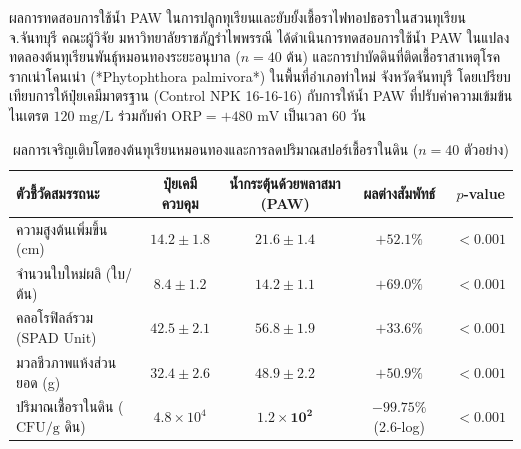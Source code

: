 \begin{agribox}{ผลการทดสอบการใช้น้ำ PAW ในการปลูกทุเรียนและยับยั้งเชื้อราไฟทอปธอราในสวนทุเรียน จ.จันทบุรี}
คณะผู้วิจัย มหาวิทยาลัยราชภัฏรำไพพรรณี ได้ดำเนินการทดสอบการใช้น้ำ PAW ในแปลงทดลองต้นทุเรียนพันธุ์หมอนทองระยะอนุบาล ($n = 40$ ต้น) และการบำบัดดินที่ติดเชื้อราสาเหตุโรครากเน่าโคนเน่า (*Phytophthora palmivora*) ในพื้นที่อำเภอท่าใหม่ จังหวัดจันทบุรี โดยเปรียบเทียบการให้ปุ๋ยเคมีมาตรฐาน (Control NPK 16-16-16) กับการให้น้ำ PAW ที่ปรับค่าความเข้มข้นไนเตรต $120 \text{ mg/L}$ ร่วมกับค่า $\text{ORP} = +480 \text{ mV}$ เป็นเวลา 60 วัน

\begin{table}[H]
\centering
\small
\caption{ผลการเจริญเติบโตของต้นทุเรียนหมอนทองและการลดปริมาณสปอร์เชื้อราในดิน ($n = 40$ ตัวอย่าง)}
\label{tab:ch05_paw_durian}
\begin{tabular}{lcccc}
\toprule
\textbf{ตัวชี้วัดสมรรถนะ} & \textbf{ปุ๋ยเคมีควบคุม} & \textbf{น้ำกระตุ้นด้วยพลาสมา (PAW)} & \textbf{ผลต่างสัมพัทธ์} & \textbf{$p$-value} \\
\midrule
ความสูงต้นเพิ่มขึ้น (cm) & $14.2 \pm 1.8$ & $\mathbf{21.6 \pm 1.4}$ & $+52.1\%$ & $<0.001$ \\
จำนวนใบใหม่ผลิ (ใบ/ต้น) & $8.4 \pm 1.2$ & $\mathbf{14.2 \pm 1.1}$ & $+69.0\%$ & $<0.001$ \\
คลอโรฟิลล์รวม (SPAD Unit) & $42.5 \pm 2.1$ & $\mathbf{56.8 \pm 1.9}$ & $+33.6\%$ & $<0.001$ \\
มวลชีวภาพแห้งส่วนยอด (g) & $32.4 \pm 2.6$ & $\mathbf{48.9 \pm 2.2}$ & $+50.9\%$ & $<0.001$ \\
ปริมาณเชื้อราในดิน ($\text{CFU/g}$ ดิน) & $4.8 \times 10^4$ & $\mathbf{1.2 \times 10^2}$ & $-99.75\%$ (2.6-log) & $<0.001$ \\
\bottomrule
\end{tabular}
\end{table}


\end{agribox}
